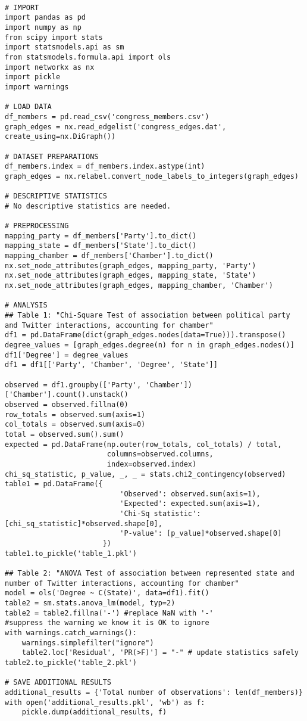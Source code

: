 \documentclass[11pt]{article}
\begin{document}
\begin{verbatim}

# IMPORT
import pandas as pd 
import numpy as np
from scipy import stats
import statsmodels.api as sm
from statsmodels.formula.api import ols
import networkx as nx
import pickle
import warnings

# LOAD DATA
df_members = pd.read_csv('congress_members.csv')
graph_edges = nx.read_edgelist('congress_edges.dat', create_using=nx.DiGraph())

# DATASET PREPARATIONS
df_members.index = df_members.index.astype(int)
graph_edges = nx.relabel.convert_node_labels_to_integers(graph_edges)

# DESCRIPTIVE STATISTICS
# No descriptive statistics are needed.

# PREPROCESSING
mapping_party = df_members['Party'].to_dict()
mapping_state = df_members['State'].to_dict()
mapping_chamber = df_members['Chamber'].to_dict()
nx.set_node_attributes(graph_edges, mapping_party, 'Party')
nx.set_node_attributes(graph_edges, mapping_state, 'State')
nx.set_node_attributes(graph_edges, mapping_chamber, 'Chamber')

# ANALYSIS
## Table 1: "Chi-Square Test of association between political party and Twitter interactions, accounting for chamber"
df1 = pd.DataFrame(dict(graph_edges.nodes(data=True))).transpose()
degree_values = [graph_edges.degree(n) for n in graph_edges.nodes()]
df1['Degree'] = degree_values
df1 = df1[['Party', 'Chamber', 'Degree', 'State']]

observed = df1.groupby(['Party', 'Chamber'])['Chamber'].count().unstack()
observed = observed.fillna(0) 
row_totals = observed.sum(axis=1)
col_totals = observed.sum(axis=0)
total = observed.sum().sum()
expected = pd.DataFrame(np.outer(row_totals, col_totals) / total, 
                        columns=observed.columns, 
                        index=observed.index)
chi_sq_statistic, p_value, _, _ = stats.chi2_contingency(observed)
table1 = pd.DataFrame({
                           'Observed': observed.sum(axis=1),
                           'Expected': expected.sum(axis=1),
                           'Chi-Sq statistic': [chi_sq_statistic]*observed.shape[0],
                           'P-value': [p_value]*observed.shape[0]
                       })
table1.to_pickle('table_1.pkl')

## Table 2: "ANOVA Test of association between represented state and number of Twitter interactions, accounting for chamber"
model = ols('Degree ~ C(State)', data=df1).fit()
table2 = sm.stats.anova_lm(model, typ=2)
table2 = table2.fillna('-') #replace NaN with '-'
#suppress the warning we know it is OK to ignore
with warnings.catch_warnings():
    warnings.simplefilter("ignore")
    table2.loc['Residual', 'PR(>F)'] = "-" # update statistics safely
table2.to_pickle('table_2.pkl')

# SAVE ADDITIONAL RESULTS
additional_results = {'Total number of observations': len(df_members)}
with open('additional_results.pkl', 'wb') as f:
    pickle.dump(additional_results, f)

\end{verbatim}
\end{document}
